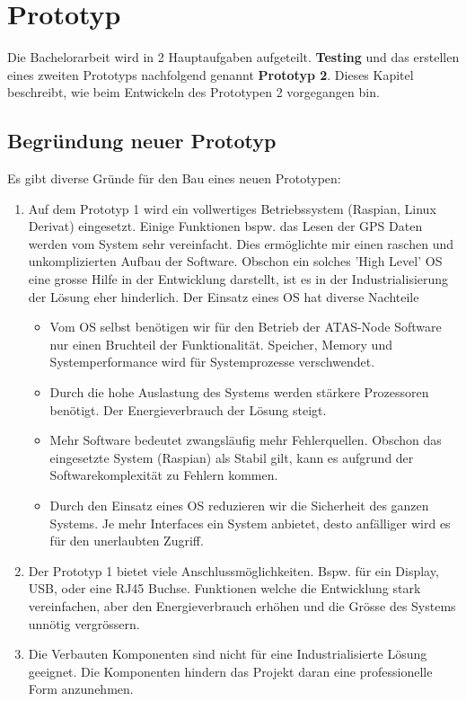 \documentclass[11pt,english,german]{report}
\theoremstyle{definition}
\begin{document}
\chapter{Prototyp}
Die Bachelorarbeit wird in 2 Hauptaufgaben aufgeteilt.\textbf{ Testing} und das erstellen eines zweiten Prototyps nachfolgend genannt \textbf{Prototyp 2}. Dieses Kapitel beschreibt, wie beim Entwickeln des Prototypen 2 vorgegangen bin.

\section{Begründung neuer Prototyp}
Es gibt diverse Gründe für den Bau eines neuen Prototypen:
\begin{enumerate}
	\item Auf dem Prototyp 1 wird ein vollwertiges Betriebssystem (Raspian, Linux Derivat) eingesetzt. Einige Funktionen bspw. das Lesen der GPS Daten werden vom System sehr vereinfacht. Dies ermöglichte mir einen raschen und unkomplizierten Aufbau der Software. Obschon ein solches 'High Level' OS eine grosse Hilfe in der Entwicklung darstellt, ist es in der Industrialisierung der Lösung eher hinderlich. Der Einsatz eines OS hat diverse Nachteile
	\begin{itemize}
		\item Vom OS selbst benötigen wir für den Betrieb der ATAS-Node Software nur einen Bruchteil der Funktionalität. Speicher, Memory und Systemperformance wird für Systemprozesse verschwendet. 
		\item Durch die hohe Auslastung des Systems werden stärkere Prozessoren benötigt. Der Energieverbrauch der Lösung steigt.
		\item Mehr Software bedeutet zwangsläufig mehr Fehlerquellen. Obschon das eingesetzte System (Raspian) als Stabil gilt, kann es aufgrund der Softwarekomplexität zu Fehlern kommen.
		\item Durch den Einsatz eines OS reduzieren wir die Sicherheit des ganzen Systems. Je mehr Interfaces ein System anbietet, desto anfälliger wird es für den unerlaubten Zugriff.
	\end{itemize}
	\item Der Prototyp 1 bietet viele Anschlussmöglichkeiten. Bspw. für ein Display, USB, oder eine RJ45 Buchse. Funktionen welche die  Entwicklung stark vereinfachen, aber den Energieverbrauch erhöhen und die Grösse des Systems unnötig vergrössern. 
	\item Die Verbauten Komponenten sind nicht für eine Industrialisierte Lösung geeignet. Die Komponenten hindern das Projekt daran eine professionelle Form anzunehmen.
\end{enumerate}
\end{document}
